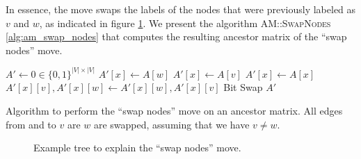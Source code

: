 In essence, the move swaps the labels of the nodes that were previously labeled as $v$ and $w$, as indicated in figure \ref{fig:swap nodes}. We present the algorithm \textsc{AM::SwapNodes} \ref{alg:am_swap_nodes} that computes the resulting ancestor matrix of the ``swap nodes'' move.

\begin{algorithm}
    \begin{algorithmic}[1]
            \State $A' \leftarrow 0 \in \{0,1\}^{|V| \times |V|}$
                    \State $A'[x] \leftarrow A[w]$
                    \State $A'[x] \leftarrow A[v]$
                \Else
                    \State $A'[x] \leftarrow A[x]$
                \EndIf
                \State $A'[x][v], A'[x][w] \leftarrow A'[x][w], A'[x][v]$ \Comment Bit Swap
            \EndFor
            \State \Return $A'$
        \EndFunction
    \end{algorithmic}
    \caption{Algorithm to perform the ``swap nodes'' move on an ancestor matrix. All edges from and to $v$ are $w$ are swapped, assuming that we have $v \neq w$.}
    \label{alg:am_swap_nodes}
\end{algorithm}

\begin{figure}
    \centering
    \caption{Example tree to explain the ``swap nodes'' move.}
    \label{fig:swap nodes}
\end{figure}


